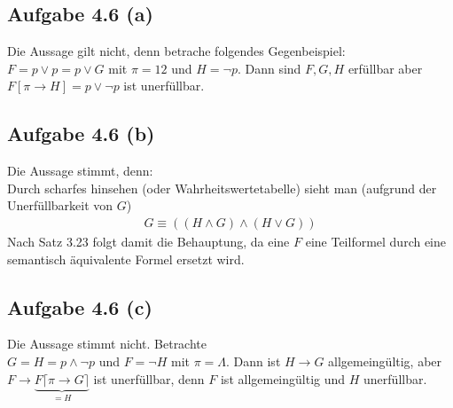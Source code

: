 \documentclass[12pt,a4paper]{article}
\begin{document}
\subsection*{Aufgabe 4.6 (a)}
Die Aussage gilt nicht, denn betrache folgendes Gegenbeispiel:\\
$F=p\vee p=p\vee G$ mit $\pi=12$ und $H=\neg p$. Dann sind $F,G,H$ erfüllbar aber \\
$F[\pi\to H]=p\vee\neg p$ ist unerfüllbar.

\subsection*{Aufgabe 4.6 (b)}
Die Aussage stimmt, denn:\\
Durch scharfes hinsehen (oder Wahrheitswertetabelle) sieht man (aufgrund der Unerfüllbarkeit von $G$)
\begin{align*}
G\equiv((H\wedge G)\wedge(H\vee G))
\end{align*}
Nach Satz 3.23 folgt damit die Behauptung, da eine $F$ eine Teilformel durch eine semantisch äquivalente Formel ersetzt wird.

\subsection*{Aufgabe 4.6 (c)}
Die Aussage stimmt nicht. Betrachte\\
$G=H=p\wedge\neg p$ und $F=\neg H$ mit $\pi=\Lambda$. Dann ist $H\to G$ allgemeingültig, aber
$F\to \underbrace{F\lceil\pi\to G\rceil}_{=H}$ ist unerfüllbar, denn $F$ ist allgemeingültig und $H$ unerfüllbar.
\end{document}
